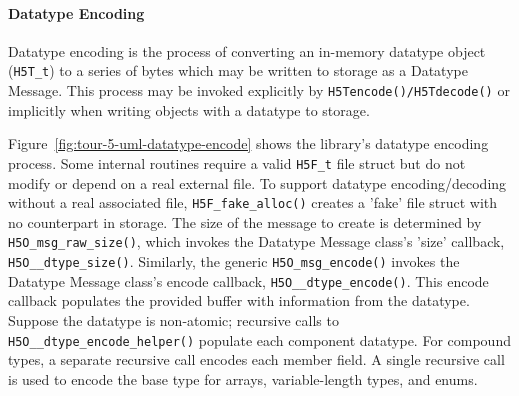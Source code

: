\paragraph{Datatype Encoding} Datatype encoding is the process of converting an in-memory datatype object (\texttt{H5T\_t}) to a series of bytes which may be written to storage as a Datatype Message. This process may be invoked explicitly by \texttt{H5Tencode()/H5Tdecode()} or implicitly when writing objects with a datatype to storage. 

Figure~\ref{fig:tour-5-uml-datatype-encode} shows the library's datatype encoding process. Some internal routines require a valid \texttt{H5F\_t} file struct but do not modify or depend on a real external file. To support datatype encoding/decoding without a real associated file, \texttt{H5F\_fake\_alloc()} creates a 'fake' file struct with no counterpart in storage. The size of the message to create is determined by \texttt{H5O\_msg\_raw\_size()}, which invokes the Datatype Message class's  'size' callback, \texttt{H5O\_\_dtype\_size()}. Similarly, the generic \texttt{H5O\_msg\_encode()} invokes the Datatype Message class's encode callback, \texttt{H5O\_\_dtype\_encode()}. This encode callback populates the provided buffer with information from the datatype. Suppose the datatype is non-atomic; recursive calls to \texttt{H5O\_\_dtype\_encode\_helper()} populate each component datatype. For compound types, a separate recursive call encodes each member field. A single recursive call is used to encode the base type for arrays, variable-length types, and enums.

